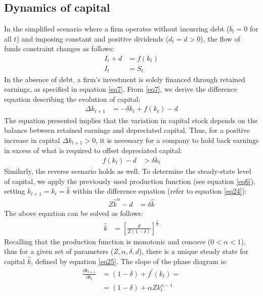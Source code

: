 \documentclass[12pt]{report}
\begin{document}
\subsection{Dynamics of capital}
In the
simplified scenario where a firm operates without incurring debt (\(b_t = 0\) for all \(t\)) and imposing constant and
positive dividends (\(d_t=d>0\)), the flow of funds constraint changes as follows:
\begin{align}
    I_t + d &= f(k_{t}) \\
    I_t &= S_t \label{eq7}
\end{align}
In the absence of debt, a firm's investment is solely financed through retained earnings, as
specified in equation \ref{eq7}. From \ref{eq7}, we derive the difference equation describing the evolution of capital:
\begin{align}
    \Delta{k_{t+1}} &=  -\delta k_t + f(k_{t}) - d \label{eq24}
\end{align}
The equation presented implies that the variation in capital stock depends on the balance between retained earnings and
depreciated capital. Thus, for a positive increase in capital \(\Delta{k_{t+1}} > 0\), it is necessary for a company to
hold back earnings in excess of what is required to offset depreciated capital:
\begin{align*}
    f(k_{t}) - d &> \delta k_t
\end{align*}
Similarly, the reverse scenario holds as well.
To determine the steady-state level of capital, we apply the previously used production function (see equation \ref{eq6}),
setting \(k_{t+1}=k_{t}=\hat{k}\) within the difference equation (refer to equation \ref{eq24}): 
\begin{align}
    Z \hat{k}^{\alpha} - d&=  \delta \hat{k}
\end{align}
The above equation can be solved as follows:
\begin{align}
     \hat{k} &=  \left[\frac{d}{Z(1-\delta)}\right]^{\frac{1}{\alpha}} \label{eq25}
\end{align}
Recalling that the production function is monotonic and concave (\(0<\alpha<1\)), thus for a given set of parameters
(\(Z,\alpha,\delta,d\)), there is a unique steady state for capital \(\hat{k}\), defined by equation \ref{eq25}.
The slope of the phase diagram is:
\begin{align}
    \frac{\partial k_{t+1}}{\partial k_{t}} &= (1-\delta) + f^{\prime}(k_{t}) = \\
     &= (1-\delta) + \alpha Z k_{t}^{\alpha-1} \label{eq8}
\end{align}
\end{document}
